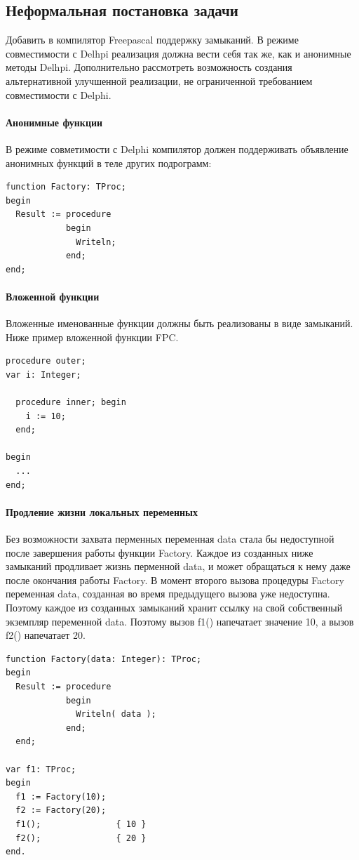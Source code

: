 \documentclass{imcs}
\begin{document}
\subsection{Неформальная постановка задачи}

Добавить в компилятор Freepascal поддержку замыканий. В режиме совместимости с 
Delhpi реализация должна вести себя так же, как и анонимные методы
Delhpi. Дополнительно рассмотреть возможность создания альтернативной улучшенной
реализации, не ограниченной требованием совместимости с Delphi.

\paragraph{Анонимные функции}
В режиме совметимости с Delphi компилятор должен поддерживать объявление анонимных функций
в теле других подрограмм:
\begin{lstlisting}
function Factory: TProc;
begin
  Result := procedure
            begin
              Writeln;
            end;
end;
\end{lstlisting}

\paragraph{Вложенной функции}
Вложенные именованные функции должны быть реализованы в виде замыканий. Ниже пример
вложенной функции FPC.
\begin{lstlisting}    
procedure outer;
var i: Integer;

  procedure inner; begin
    i := 10;
  end;

begin
  ...
end;    
\end{lstlisting}

\paragraph{Продление жизни локальных переменных}
Без возможности захвата перменных переменная data стала бы недоступной после завершения
работы функции Factory. Каждое из созданных ниже замыканий продливает жизнь перменной
data, и может обращаться к нему даже после окончания работы Factory. В момент второго
вызова процедуры Factory переменная data, созданная во время предыдущего вызова уже
недоступна. Поэтому каждое из созданных замыканий хранит ссылку на свой собственный
экземпляр переменной data. Поэтому вызов f1() напечатает значение 10, а вызов f2()
напечатает 20.
\begin{lstlisting}
function Factory(data: Integer): TProc;
begin
  Result := procedure
            begin
              Writeln( data );
            end;
  end;
    
var f1: TProc;
begin
  f1 := Factory(10);
  f2 := Factory(20);
  f1();               { 10 }
  f2();               { 20 }
end.
\end{lstlisting}    
\end{document}
